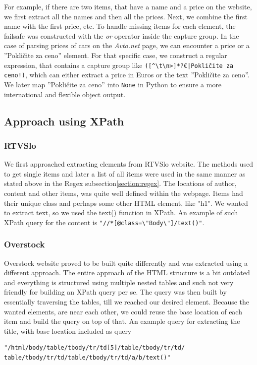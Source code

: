 \documentclass[9pt]{IEEEtran}
\begin{document}
For example, if there are two items, that have a name and a price on the website, we first extract all the names and then all the prices. Next, we combine the first name with the first price, etc. To handle missing items for each element, the failsafe was constructed with the \textit{or} operator inside the capture group. In the case of parsing prices of cars on the \textit{Avto.net} page, we can encounter a price or a ''Pokličite za ceno'' element. For that specific case, we construct a regular expression, that contains a capture group like \verb/([^\t\n>]*?€|Pokličite za ceno!)/, which can either extract a price in Euros or the text ''Pokličite za ceno''. We later map ''Pokličite za ceno'' into \texttt{None} in Python to ensure a more international and flexible object output.

\subsection{Approach using XPath}
\label{section:XPath}
\subsubsection{RTVSlo}
We first approached extracting elements from RTVSlo website. The methods used to get single items and later a list of all items were used in the same manner as stated above in the Regex subsection\ref{section:regex}. The locations of author, content and other items, was quite well defined within the webpage. Items had their unique class and perhaps some other HTML element, like "h1". We wanted to extract text, so we used the text() function in XPath. An example of such XPath query for the content is 
\verb|"//*[@class=\"Body\"]/text()"|.
\subsubsection{Overstock}
Overstock website proved to be built quite differently and was extracted using a different approach. 
The entire approach of the HTML structure is a bit outdated and everything is structured using multiple nested tables and such not very friendly for building an XPath query per se. 
The query was then built by essentially traversing the tables, till we reached our desired element. 
Because the wanted elements, are near each other, we could reuse the base location of each item and build the query on top of that. 
An example query for extracting the title, with base location included as query
\begin{verbatim}
"/html/body/table/tbody/tr/td[5]/table/tbody/tr/td/
table/tbody/tr/td/table/tbody/tr/td/a/b/text()"
\end{verbatim}
\end{document}

